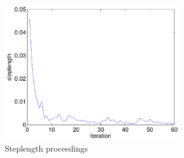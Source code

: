 \begin{figure}[h!]
\begin{center}
\includegraphics[width=0.7\textwidth]{fig_toy/toy_steplength}
\caption[Toy example - misfit]{Steplength proceedings}\label{fig:toy_steplength}
\end{center}
\end{figure}

